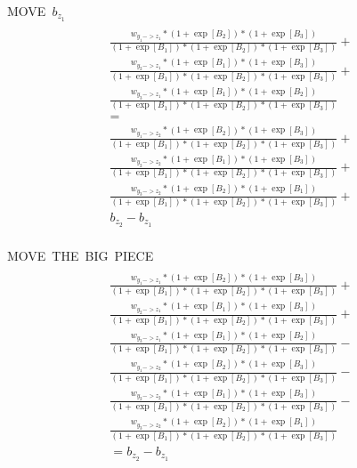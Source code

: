 \documentclass{article}
\begin{document}
\hbox{MOVE $b_{z_1}$}
\begin{multline}
    \\
    \frac{w_{y_1->z_1} * (1+\exp[B_2]) * (1+\exp[B_3])}
        {(1+\exp[B_1]) * (1+\exp[B_2]) * (1+\exp[B_3])} +\\
    \frac{w_{y_2->z_1} * (1+\exp[B_1]) * (1+\exp[B_3])}
        {(1+\exp[B_1]) * (1+\exp[B_2]) * (1+\exp[B_3])} +\\
    \frac{w_{y_3->z_1} * (1+\exp[B_1]) * (1+\exp[B_2])}
        {(1+\exp[B_1]) * (1+\exp[B_2]) * (1+\exp[B_3])}
    \\=\\
    \frac{w_{y_1->z_2} * (1+\exp[B_2]) * (1+\exp[B_3])}
        {(1+\exp[B_1]) * (1+\exp[B_2]) * (1+\exp[B_3])} +\\
    \frac{w_{y_2->z_2} * (1+\exp[B_1]) * (1+\exp[B_3])}
        {(1+\exp[B_1]) * (1+\exp[B_2]) * (1+\exp[B_3])} +\\
    \frac{w_{y_3->z_2} * (1+\exp[B_2]) * (1+\exp[B_1])}
        {(1+\exp[B_1]) * (1+\exp[B_2]) * (1+\exp[B_3])} +\\
        b_{z_2} - b_{z_1}
    \\
\end{multline}

\hbox{MOVE THE BIG PIECE}
\begin{multline}
    \\
    \frac{w_{y_1->z_1} * (1+\exp[B_2]) * (1+\exp[B_3])}
        {(1+\exp[B_1]) * (1+\exp[B_2]) * (1+\exp[B_3])} +\\
    \frac{w_{y_2->z_1} * (1+\exp[B_1]) * (1+\exp[B_3])}
        {(1+\exp[B_1]) * (1+\exp[B_2]) * (1+\exp[B_3])} +\\
    \frac{w_{y_3->z_1} * (1+\exp[B_1]) * (1+\exp[B_2])}
        {(1+\exp[B_1]) * (1+\exp[B_2]) * (1+\exp[B_3])} -\\
    \frac{w_{y_1->z_2} * (1+\exp[B_2]) * (1+\exp[B_3])}
        {(1+\exp[B_1]) * (1+\exp[B_2]) * (1+\exp[B_3])} -\\
    \frac{w_{y_2->z_2} * (1+\exp[B_1]) * (1+\exp[B_3])}
        {(1+\exp[B_1]) * (1+\exp[B_2]) * (1+\exp[B_3])} -\\
    \frac{w_{y_3->z_2} * (1+\exp[B_2]) * (1+\exp[B_1])}
        {(1+\exp[B_1]) * (1+\exp[B_2]) * (1+\exp[B_3])}
    \\=b_{z_2} - b_{z_1}
    \\
\end{multline}
\end{document}

